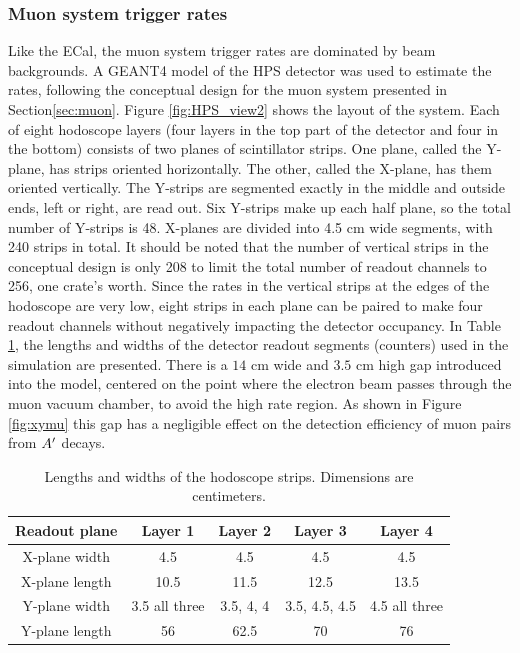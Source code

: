 \subsubsection{Muon system trigger rates}
\label{sec:muontrigg}

Like the ECal, the muon system trigger rates are dominated by beam backgrounds.  
A GEANT4 model of the HPS detector was used to estimate the rates, following the conceptual design for the muon system presented in 
Section\ref{sec:muon}. Figure \ref{fig:HPS_view2} shows the layout of the system. Each of eight hodoscope layers (four layers in 
the top part of the detector and four in the bottom) consists of two planes of scintillator strips. One plane, called the Y-plane, has strips 
oriented horizontally. The other, called the X-plane, has them oriented vertically. The Y-strips are segmented exactly in the middle
and outside ends, left or right, are read out. 
Six Y-strips make up each half plane, so the total number of Y-strips is 48. 
X-planes are divided into 4.5 cm wide segments, with 240 strips in total. It should be noted that the number of vertical strips 
in the conceptual design is only 208 to limit the total number of readout channels to 256, one crate's worth. Since the rates in the 
vertical strips at the edges of the hodoscope are very low, eight strips in each 
plane can be paired to make four readout channels without negatively impacting the detector occupancy. In Table \ref{tb:muonstrp}, 
the lengths and widths of the detector readout segments (counters) used in the simulation are presented. There is a $14$ cm wide 
and $3.5$ cm high gap 
introduced into the model, centered on the point where the electron beam passes through the muon vacuum chamber, to avoid the high rate region.
As shown in Figure \ref{fig:xymu} 
this gap has a negligible effect on the detection efficiency of muon pairs from $A^\prime$ decays. 

\begin{table}[htdp]
\caption{Lengths and widths of the hodoscope strips. Dimensions are centimeters.}
\begin{center}
\begin{tabular}{|c|c|c|c|c|}
\hline\hline
Readout plane& Layer 1&Layer 2&Layer 3& Layer 4 \\
\hline
X-plane width& 4.5& 4.5 & 4.5 & 4.5  \\
X-plane length&10.5&11.5&12.5&13.5\\
\hline
Y-plane width& 3.5 all three&3.5, 4, 4  & 3.5, 4.5, 4.5 & 4.5 all three\\
Y-plane length&56&62.5&70&76\\
\hline\hline
\end{tabular}
\end{center}
\label{tb:muonstrp}
\end{table}%

